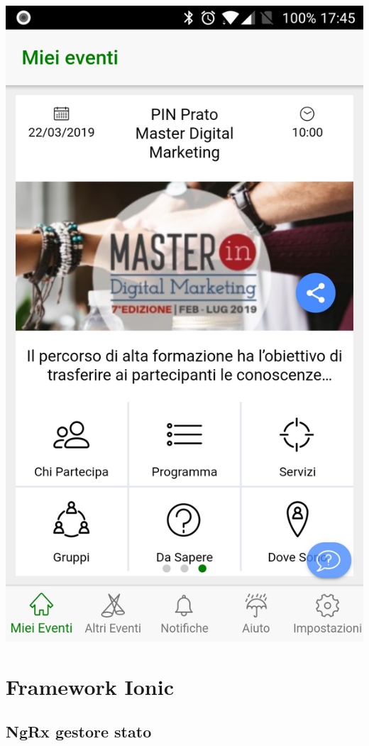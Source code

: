 \includegraphics[scale=0.15]{img/cap2/2}\\

\section{Framework Ionic}
\subsection{NgRx gestore stato}
